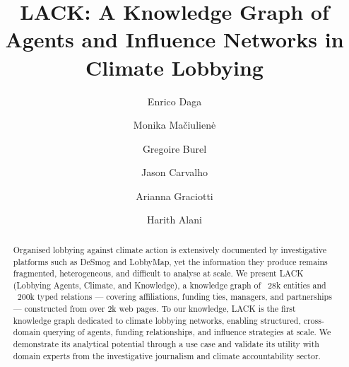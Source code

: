 \documentclass[runningheads]{llncs}
\begin{document}
\title{LACK: A Knowledge Graph of Agents and Influence Networks in Climate Lobbying}

\author{Enrico Daga \and
Monika Mačiulienė \and
Gregoire Burel \and
Jason Carvalho \and
Arianna Graciotti \and
Harith Alani }



\maketitle

\begin{abstract}
Organised lobbying against climate action is extensively documented by investigative platforms such as DeSmog and LobbyMap, yet the information they produce remains fragmented, heterogeneous, and difficult to analyse at scale. We present LACK (Lobbying Agents, Climate, and Knowledge), a knowledge graph of ~28k entities and ~200k typed relations — covering affiliations, funding ties, managers, and partnerships — constructed from over 2k web pages.
To our knowledge, LACK is the first knowledge graph dedicated to climate lobbying networks, enabling structured, cross-domain querying of agents, funding relationships, and influence strategies at scale.
We demonstrate its analytical potential through a use case and validate its utility with domain experts from the investigative journalism and climate accountability sector.

\end{abstract}


\end{document}
